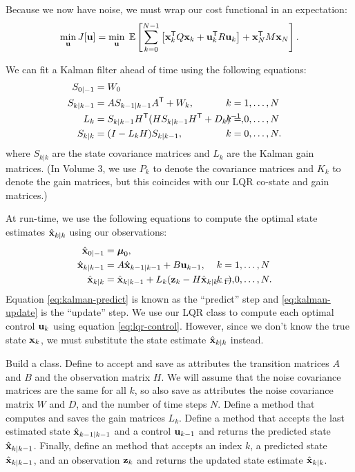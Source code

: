 Because we now have noise, we must wrap our cost functional in an expectation:
\begin{equation}
\min_{\mathbf{u}} J[\mathbf{u}] = \min_{\mathbf{u}} \; \mathbb E\left[\sum_{k=0}^{N-1} \left[\mathbf{x}_k^{\mathsf T} Q \mathbf{x}_k + \mathbf{u}_k^{\mathsf T} R \mathbf{u}_k\right] + \mathbf{x}_N^{\mathsf T} M \mathbf{x}_N \right].
\end{equation}

We can fit a Kalman filter ahead of time using the following equations:
\begin{align}
\nonumber
S_{0|-1} &= W_0\\
S_{k|k-1} &= A S_{k-1|k-1} A\trp + W_k, &&\hspace{-1cm}k = 1, \ldots, N\\
L_k &= S_{k|k-1} H\trp (H S_{k|k-1} H\trp + D_k)^{-1}, &&\hspace{-1cm}k = 0, \ldots, N\\
S_{k|k} &= (I - L_k H) S_{k|k-1}, &&\hspace{-1cm}k = 0, \ldots, N.
\end{align}
where $S_{k|k}$ are the state covariance matrices and $L_k$ are the Kalman gain matrices.
(In Volume 3, we use $P_k$ to denote the covariance matrices and $K_k$ to denote the gain matrices, but this coincides with our LQR co-state and gain matrices.)

At run-time, we use the following equations to compute the optimal state estimates $\hat {\mathbf{x}}_{k|k}$ using our observations:
\begin{align}
\nonumber
\hat {\x}_{0|-1} &= \boldsymbol \mu_0,\\
\label{eq:kalman-predict}
\hat {\x}_{k|k-1} &= A \hat {\x}_{k-1|k-1} + B \u_{k-1}, &&\hspace{-1cm}k = 1, \ldots, N\\
\label{eq:kalman-update}
\hat {\x}_{k|k} &= \hat {\x}_{k|k-1} + L_k (\z_k - H \hat {\x}_{k|k-1}), &&\hspace{-1cm}k = 0, \ldots, N.
\end{align}
Equation \eqref{eq:kalman-predict} is known as the ``predict'' step and \eqref{eq:kalman-update} is the ``update'' step.
We use our LQR class to compute each optimal control $\mathbf{u}_k$ using equation \eqref{eq:lqr-control}.
However, since we don't know the true state $\mathbf{x}_k$, we must substitute the state estimate $\hat {\mathbf{x}}_{k|k}$ instead.

\begin{problem}
\label{prob:kalman-filter}
Build a  class.
Define  to accept and save as attributes the transition matrices $A$ and $B$ and the observation matrix $H$.
We will assume that the noise covariance matrices are the same for all $k$, so also save as attributes the noise covariance matrix $W$ and $D$, and the number of time steps $N$.
Define a  method that computes and saves the gain matrices $L_k$.
Define a  method that accepts the last estimated state $\hat {\mathbf{x}}_{k-1|k-1}$ and a control $\mathbf{u}_{k-1}$ and returns the predicted state $\hat {\mathbf{x}}_{k|k-1}$.
Finally, define an  method that accepts an index $k$, a predicted state $\hat {\mathbf{x}}_{k|k-1}$, and an observation $\mathbf{z}_k$ and returns the updated state estimate $\hat {\mathbf{x}}_{k|k}$.
\end{problem}

